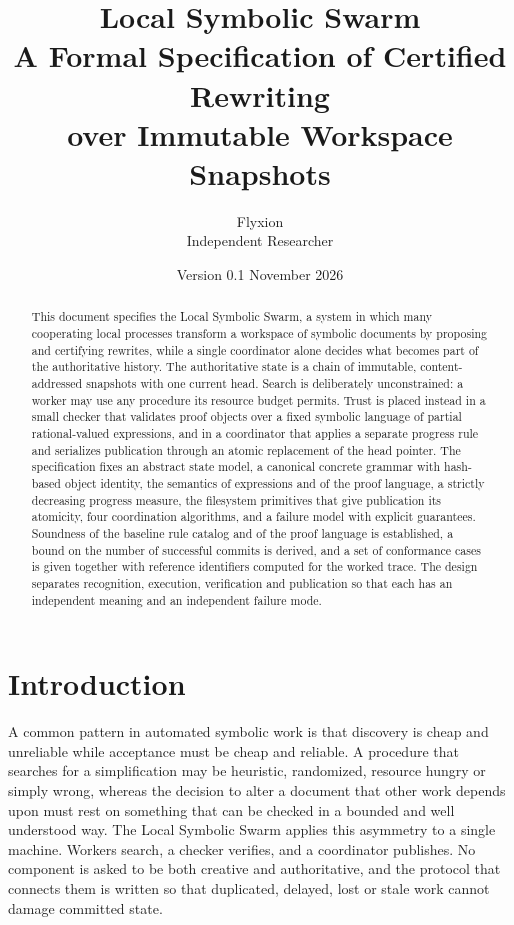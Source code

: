 \documentclass[11pt,a4paper]{article}
\title{Local Symbolic Swarm\\[0.5em]\large A Formal Specification of Certified Rewriting\\over Immutable Workspace Snapshots}
\author{Flyxion\\Independent Researcher}
\date{Version 0.1 \quad November 2026}
\theoremstyle{plain}
\theoremstyle{definition}
\theoremstyle{remark}
\theoremstyle{definition}
\begin{document}
\maketitle

\begin{abstract}
\noindent This document specifies the Local Symbolic Swarm, a system in which many cooperating local processes transform a workspace of symbolic documents by proposing and certifying rewrites, while a single coordinator alone decides what becomes part of the authoritative history. The authoritative state is a chain of immutable, content-addressed snapshots with one current head. Search is deliberately unconstrained: a worker may use any procedure its resource budget permits. Trust is placed instead in a small checker that validates proof objects over a fixed symbolic language of partial rational-valued expressions, and in a coordinator that applies a separate progress rule and serializes publication through an atomic replacement of the head pointer. The specification fixes an abstract state model, a canonical concrete grammar with hash-based object identity, the semantics of expressions and of the proof language, a strictly decreasing progress measure, the filesystem primitives that give publication its atomicity, four coordination algorithms, and a failure model with explicit guarantees. Soundness of the baseline rule catalog and of the proof language is established, a bound on the number of successful commits is derived, and a set of conformance cases is given together with reference identifiers computed for the worked trace. The design separates recognition, execution, verification and publication so that each has an independent meaning and an independent failure mode.
\end{abstract}

\tableofcontents

\section{Introduction}

A common pattern in automated symbolic work is that discovery is cheap and unreliable while acceptance must be cheap and reliable. A procedure that searches for a simplification may be heuristic, randomized, resource hungry or simply wrong, whereas the decision to alter a document that other work depends upon must rest on something that can be checked in a bounded and well understood way. The Local Symbolic Swarm applies this asymmetry to a single machine. Workers search, a checker verifies, and a coordinator publishes. No component is asked to be both creative and authoritative, and the protocol that connects them is written so that duplicated, delayed, lost or stale work cannot damage committed state.
\end{document}
